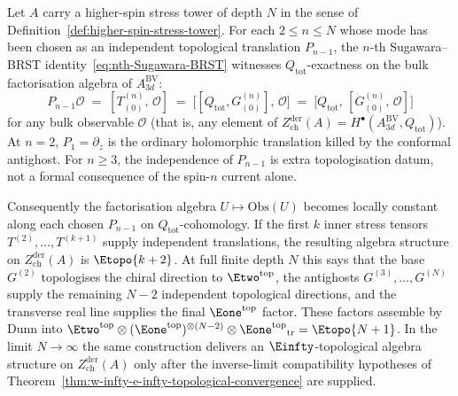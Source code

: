 \begin{construction}
\label{constr:iterated-topologization}
Let $A$ carry a higher-spin stress tower of depth $N$ in the sense of
Definition~\ref{def:higher-spin-stress-tower}. For each $2 \le n \le N$
whose mode has been chosen as an independent topological translation
$P_{n-1}$, the $n$-th Sugawara--BRST identity~\eqref{eq:nth-Sugawara-BRST}
witnesses $Q_{\mathrm{tot}}$-exactness on the bulk factorisation algebra
of $A^{\mathrm{BV}}_{3d}$:
\begin{equation}\label{eq:dnz-Q-exact}
P_{n-1}\mathcal{O}
\;=\;
[T^{(n)}_{(0)},\, \mathcal{O}]
\;=\;
\bigl[[Q_{\mathrm{tot}}, G^{(n)}_{(0)}],\, \mathcal{O}\bigr]
\;=\;
\bigl[Q_{\mathrm{tot}},\, [G^{(n)}_{(0)},\, \mathcal{O}]\bigr]
\end{equation}
for any bulk observable $\mathcal{O}$ (that is, any element of
$Z^{\mathrm{der}}_{\mathrm{ch}}(A) = H^\bullet(A^{\mathrm{BV}}_{3d},
Q_{\mathrm{tot}})$). At $n=2$, $P_1=\partial_z$ is the ordinary
holomorphic translation killed by the conformal antighost. For $n\ge3$,
the independence of $P_{n-1}$ is extra topologisation datum, not a
formal consequence of the spin-$n$ current alone.

Consequently the factorisation algebra
$U \mapsto \mathrm{Obs}(U)$ becomes locally constant along each chosen
$P_{n-1}$ on $Q_{\mathrm{tot}}$-cohomology. If the first $k$ inner stress
tensors $T^{(2)},\ldots,T^{(k+1)}$ supply independent translations, the
resulting algebra structure on $Z^{\mathrm{der}}_{\mathrm{ch}}(A)$ is
$\Etopo{k+2}$. At full finite depth $N$ this says that the base
$G^{(2)}$ topologises the chiral direction to $\Etwo^{\mathrm{top}}$,
the antighosts $G^{(3)}, \ldots, G^{(N)}$ supply the remaining $N-2$
independent topological directions, and the transverse real line supplies
the final $\Eone^{\mathrm{top}}$ factor. These factors assemble by Dunn
into
$\Etwo^{\mathrm{top}} \otimes (\Eone^{\mathrm{top}})^{\otimes (N-2)}
\otimes {\Eone^{\mathrm{top}}}_{\mathrm{tr}} = \Etopo{N+1}$.
In the limit $N \to \infty$ the same construction delivers an
$\Einfty$-topological algebra structure on
$Z^{\mathrm{der}}_{\mathrm{ch}}(A)$ only after the inverse-limit
compatibility hypotheses of
Theorem~\ref{thm:w-infty-e-infty-topological-convergence} are supplied.
\end{construction}

